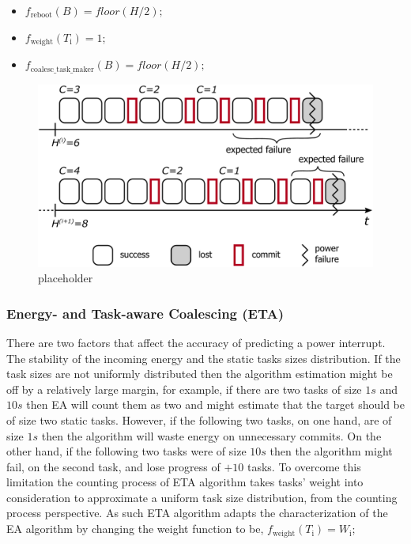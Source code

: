 \begin{itemize}
\item $f_\text{reboot}(B) = floor(H / 2);$
\item $f_\text{weight}(T_\text{i}) =  1$; 
\item $f_\text{coalesc\_task\_maker}(B) = floor(H / 2);$ 
\end{itemize}

\begin{figure}
	\centering
	\includegraphics[width=0.5\columnwidth]{figures/energy-aware-coal.pdf}
	\caption{placeholder}
	\label{fig:energyAware}
\end{figure}


\subsubsection{Energy- and Task-aware Coalescing (ETA)}
\label{subsec:energyTaskAware}
There are two factors that affect the accuracy of predicting a power interrupt. The stability of the incoming energy and the static tasks sizes distribution. If the task sizes are not uniformly distributed then the algorithm estimation might be off by a relatively large margin, for example, if there are two tasks of size $1s$ and $10s$ then EA will count them as two and might estimate that the target should be of size two static tasks. However, if the following two tasks, on one hand, are of size $1s$ then the algorithm will waste energy on unnecessary commits. On the other hand, if the following two tasks were of size $10s$ then the algorithm might fail, on the second task, and lose progress of $+10$ tasks. To overcome this limitation the counting process of ETA algorithm takes tasks' weight into consideration to approximate a uniform task size distribution, from the counting process perspective. As such ETA algorithm adapts the characterization of the EA algorithm by changing the weight function to be, $f_\text{weight}(T_\text{i}) =  W_\text{i}$; 




























